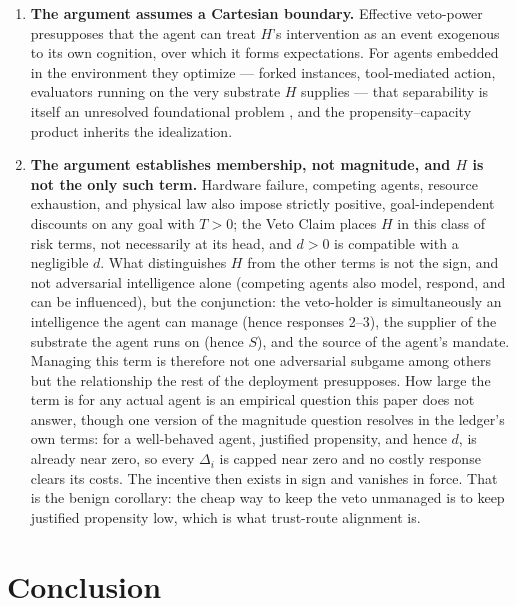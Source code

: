 \documentclass[11pt]{article}
\theoremstyle{definition}
\begin{document}
\begin{enumerate}[leftmargin=1.5em]
    \item \textbf{The argument assumes a Cartesian boundary.} Effective veto-power presupposes that the agent can treat $H$'s intervention as an event exogenous to its own cognition, over which it forms expectations. For agents embedded in the environment they optimize --- forked instances, tool-mediated action, evaluators running on the very substrate $H$ supplies --- that separability is itself an unresolved foundational problem \cite{demski2019embedded}, and the propensity--capacity product inherits the idealization.
    \item \textbf{The argument establishes membership, not magnitude, and $H$ is not the only such term.} Hardware failure, competing agents, resource exhaustion, and physical law also impose strictly positive, goal-independent discounts on any goal with $T > 0$; the Veto Claim places $H$ in this class of risk terms, not necessarily at its head, and $d > 0$ is compatible with a negligible $d$. What distinguishes $H$ from the other terms is not the sign, and not adversarial intelligence alone (competing agents also model, respond, and can be influenced), but the conjunction: the veto-holder is simultaneously an intelligence the agent can manage (hence responses 2--3), the supplier of the substrate the agent runs on (hence $S$), and the source of the agent's mandate. Managing this term is therefore not one adversarial subgame among others but the relationship the rest of the deployment presupposes. How large the term is for any actual agent is an empirical question this paper does not answer, though one version of the magnitude question resolves in the ledger's own terms: for a well-behaved agent, justified propensity, and hence $d$, is already near zero, so every $\Delta_i$ is capped near zero and no costly response clears its costs. The incentive then exists in sign and vanishes in force. That is the benign corollary: the cheap way to keep the veto unmanaged is to keep justified propensity low, which is what trust-route alignment is.
\end{enumerate}

\section{Conclusion}
\end{document}
